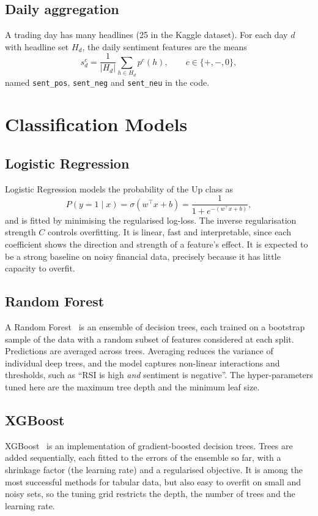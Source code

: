 \subsection{Daily aggregation}
A trading day has many headlines (25 in the Kaggle dataset). For each day $d$ with headline set $H_d$, the daily sentiment features are the means
\begin{equation}
s^{c}_d = \frac{1}{|H_d|}\sum_{h\in H_d} p^{c}(h), \qquad c\in\{+,-,0\},
\end{equation}
named \texttt{sent\_pos}, \texttt{sent\_neg} and \texttt{sent\_neu} in the code.

\section{Classification Models}

\subsection{Logistic Regression}
Logistic Regression models the probability of the Up class as
\begin{equation}
P(y=1\mid x) = \sigma(w^\top x + b) = \frac{1}{1+e^{-(w^\top x + b)}},
\end{equation}
and is fitted by minimising the regularised log-loss. The inverse regularisation strength $C$ controls overfitting. It is linear, fast and interpretable, since each coefficient shows the direction and strength of a feature's effect. It is expected to be a strong baseline on noisy financial data, precisely because it has little capacity to overfit.

\subsection{Random Forest}
A Random Forest~\cite{breiman2001random} is an ensemble of decision trees, each trained on a bootstrap sample of the data with a random subset of features considered at each split. Predictions are averaged across trees. Averaging reduces the variance of individual deep trees, and the model captures non-linear interactions and thresholds, such as ``RSI is high \emph{and} sentiment is negative''. The hyper-parameters tuned here are the maximum tree depth and the minimum leaf size.

\subsection{XGBoost}
XGBoost~\cite{chen2016xgboost} is an implementation of gradient-boosted decision trees. Trees are added sequentially, each fitted to the errors of the ensemble so far, with a shrinkage factor (the learning rate) and a regularised objective. It is among the most successful methods for tabular data, but also easy to overfit on small and noisy sets, so the tuning grid restricts the depth, the number of trees and the learning rate.

